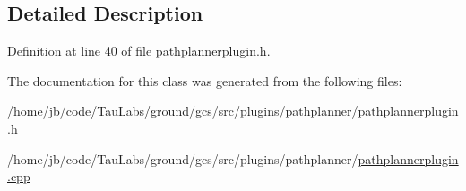 \subsection{\-Detailed \-Description}


\-Definition at line 40 of file pathplannerplugin.\-h.



\-The documentation for this class was generated from the following files\-:\begin{DoxyCompactItemize}
\item 
/home/jb/code/\-Tau\-Labs/ground/gcs/src/plugins/pathplanner/\hyperlink{pathplannerplugin_8h}{pathplannerplugin.\-h}\item 
/home/jb/code/\-Tau\-Labs/ground/gcs/src/plugins/pathplanner/\hyperlink{pathplannerplugin_8cpp}{pathplannerplugin.\-cpp}\end{DoxyCompactItemize}
